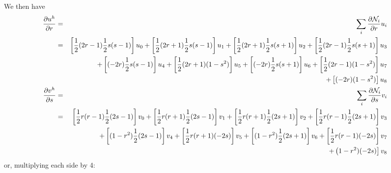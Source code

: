 We then have
\begin{eqnarray}
\frac{\partial u^h}{\partial r} 
&=& \sum_i \frac{\partial {\mathcal{N}}_i}{\partial r} u_i \nonumber\\
&=& 
\left[ \frac{1}{2}(2r-1)  \frac{1}{2}s(s-1) \right]u_0
+\left[ \frac{1}{2}(2r+1)  \frac{1}{2}s(s-1) \right]u_1
+\left[ \frac{1}{2}(2r+1)  \frac{1}{2}s(s+1) \right]u_2
+\left[ \frac{1}{2}(2r-1)  \frac{1}{2}s(s+1) \right]u_3 \nonumber\\
&&+\left[       (-2r)  \frac{1}{2}s(s-1) \right]u_4
+\left[ \frac{1}{2}(2r+1)     (1-s^2)\right]u_5
+\left[       (-2r)  \frac{1}{2}s(s+1)\right]u_6
+\left[ \frac{1}{2}(2r-1)     (1-s^2)\right]u_7 \nonumber\\
&&+\left[       (-2r)     (1-s^2)\right]u_8 \nonumber\\
\frac{\partial v^h}{\partial s} 
&=& \sum_i \frac{\partial {\mathcal{N}}_i}{\partial s} v_i \nonumber\\
&=& 
\left[ \frac{1}{2}r(r-1)  \frac{1}{2}(2s-1) \right] v_0
+\left[ \frac{1}{2}r(r+1)  \frac{1}{2}(2s-1) \right] v_1
+\left[ \frac{1}{2}r(r+1)  \frac{1}{2}(2s+1) \right] v_2
+\left[ \frac{1}{2}r(r-1)  \frac{1}{2}(2s+1) \right] v_3 \nonumber\\
&&+\left[     (1-r^2)  \frac{1}{2}(2s-1) \right] v_4
+\left[ \frac{1}{2}r(r+1)        (-2s) \right] v_5
+\left[     (1-r^2)  \frac{1}{2}(2s+1) \right] v_6
+\left[ \frac{1}{2}r(r-1)        (-2s) \right] v_7 \nonumber\\
&&+\left     (1-r^2)        (-2s) \right] v_8 \nonumber
\end{eqnarray}
or, multiplying each side by 4:
